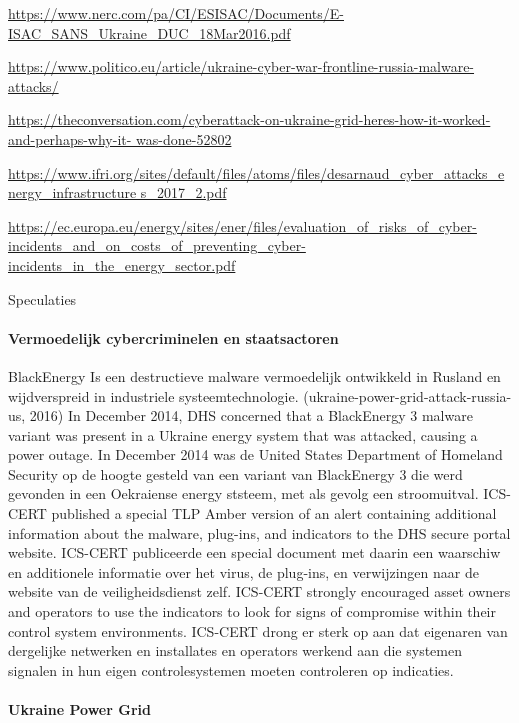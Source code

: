 		\url{https://www.nerc.com/pa/CI/ESISAC/Documents/E-ISAC_SANS_Ukraine_DUC_18Mar2016.pdf}
		
		\url{https://www.politico.eu/article/ukraine-cyber-war-frontline-russia-malware-attacks/}
		
		\url{https://theconversation.com/cyberattack-on-ukraine-grid-heres-how-it-worked-and-perhaps-why-it-
			was-done-52802}
		
		\url{	https://www.ifri.org/sites/default/files/atoms/files/desarnaud_cyber_attacks_energy_infrastructure
			s_2017_2.pdf}
	
		\url{https://ec.europa.eu/energy/sites/ener/files/evaluation_of_risks_of_cyber-
			incidents_and_on_costs_of_preventing_cyber-incidents_in_the_energy_sector.pdf}
		
		
		Speculaties
		
		
		\paragraph{Vermoedelijk cybercriminelen en staatsactoren}
		BlackEnergy
		Is een destructieve malware vermoedelijk ontwikkeld in Rusland en wijdverspreid in industriele
		systeemtechnologie. (ukraine-power-grid-attack-russia-us, 2016)
		In December 2014, DHS concerned that a BlackEnergy 3 malware variant was present in a
		Ukraine energy system that was attacked, causing a power outage. In December 2014 was
		de United States Department of Homeland Security op de hoogte gesteld van een variant
		van BlackEnergy 3 die werd gevonden in een Oekraiense energy ststeem, met als gevolg
		een stroomuitval.
		ICS-CERT published a special TLP Amber version of an alert containing additional
		information about the malware, plug-ins, and indicators to the DHS secure portal website.
		ICS-CERT publiceerde een special document met daarin een waarschiw en additionele
		informatie over het virus, de plug-ins, en verwijzingen naar de website van de
		veiligheidsdienst zelf.
		ICS-CERT strongly encouraged asset owners and operators to use the indicators to look for
		signs of compromise within their control system environments. ICS-CERT drong er sterk op
		aan dat eigenaren van dergelijke netwerken en installates en operators werkend aan die
		systemen signalen in hun eigen controlesystemen moeten controleren op indicaties.
		\paragraph{Ukraine Power Grid}
		
